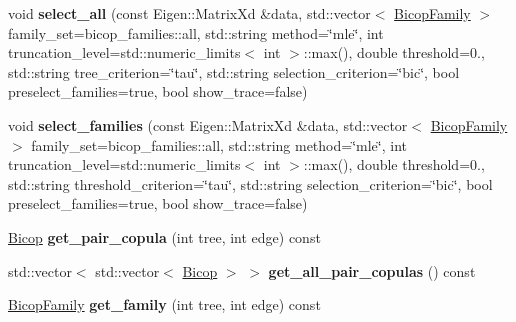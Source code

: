 \begin{DoxyCompactItemize}
\item 
void {\bfseries select\+\_\+all} (const Eigen\+::\+Matrix\+Xd \&data, std\+::vector$<$ \hyperlink{family_8hpp_a42e95cc06d33896199caab0c11ad44f3}{Bicop\+Family} $>$ family\+\_\+set=bicop\+\_\+families\+::all, std\+::string method=\char`\"{}mle\char`\"{}, int truncation\+\_\+level=std\+::numeric\+\_\+limits$<$ int $>$\+::max(), double threshold=0., std\+::string tree\+\_\+criterion=\char`\"{}tau\char`\"{}, std\+::string selection\+\_\+criterion=\char`\"{}bic\char`\"{}, bool preselect\+\_\+families=true, bool show\+\_\+trace=false)\hypertarget{classvinecopulib_1_1_vinecop_a6f9f35b5973e0da272770706af77dc11}{}\label{classvinecopulib_1_1_vinecop_a6f9f35b5973e0da272770706af77dc11}

\item 
void {\bfseries select\+\_\+families} (const Eigen\+::\+Matrix\+Xd \&data, std\+::vector$<$ \hyperlink{family_8hpp_a42e95cc06d33896199caab0c11ad44f3}{Bicop\+Family} $>$ family\+\_\+set=bicop\+\_\+families\+::all, std\+::string method=\char`\"{}mle\char`\"{}, int truncation\+\_\+level=std\+::numeric\+\_\+limits$<$ int $>$\+::max(), double threshold=0., std\+::string threshold\+\_\+criterion=\char`\"{}tau\char`\"{}, std\+::string selection\+\_\+criterion=\char`\"{}bic\char`\"{}, bool preselect\+\_\+families=true, bool show\+\_\+trace=false)\hypertarget{classvinecopulib_1_1_vinecop_ab80845e262fa37613f09d1f98d722cc8}{}\label{classvinecopulib_1_1_vinecop_ab80845e262fa37613f09d1f98d722cc8}

\item 
\hyperlink{classvinecopulib_1_1_bicop}{Bicop} {\bfseries get\+\_\+pair\+\_\+copula} (int tree, int edge) const \hypertarget{classvinecopulib_1_1_vinecop_a22262e99414e23dbe7c7f0e773041185}{}\label{classvinecopulib_1_1_vinecop_a22262e99414e23dbe7c7f0e773041185}

\item 
std\+::vector$<$ std\+::vector$<$ \hyperlink{classvinecopulib_1_1_bicop}{Bicop} $>$ $>$ {\bfseries get\+\_\+all\+\_\+pair\+\_\+copulas} () const \hypertarget{classvinecopulib_1_1_vinecop_a7a2edf23e011ec024e9863e14c12923b}{}\label{classvinecopulib_1_1_vinecop_a7a2edf23e011ec024e9863e14c12923b}

\item 
\hyperlink{family_8hpp_a42e95cc06d33896199caab0c11ad44f3}{Bicop\+Family} {\bfseries get\+\_\+family} (int tree, int edge) const \hypertarget{classvinecopulib_1_1_vinecop_ab2b5aecbe06c5219919f5b3c7436f1da}{}\label{classvinecopulib_1_1_vinecop_ab2b5aecbe06c5219919f5b3c7436f1da}


\end{DoxyCompactItemize}
